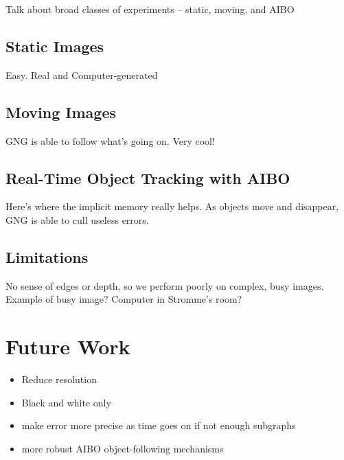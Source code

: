 \documentclass{article}
\renewcommand{\|}{\origbar} %
\begin{document}
Talk about broad classes of experiments -- static, moving, and AIBO

\subsection{Static Images}

Easy. Real and Computer-generated

\subsection{Moving Images}

GNG is able to follow what's going on. Very cool!

\subsection{Real-Time Object Tracking with AIBO}

Here's where the implicit memory really helps. As objects move and disappear, GNG is able to cull useless errors.

\subsection{Limitations}

No sense of edges or depth, so we perform poorly on complex, busy images. Example of busy image? Computer in Stromme's room?

\section{Future Work}

\begin{itemize}
  \item Reduce resolution
  \item Black and white only
  \item make error more precise as time goes on if not enough subgraphs
  \item more robust AIBO object-following mechanisms
\end{itemize}
\end{document}
